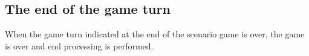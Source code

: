 \documentclass{article}
\begin{document}
\begin{CJK}{UTF8}{min}
\subsection{The end of the game turn}

When the game turn indicated at the end of the scenario game is over,
the game is over and end processing is performed.




















\end{CJK}
\end{document}
